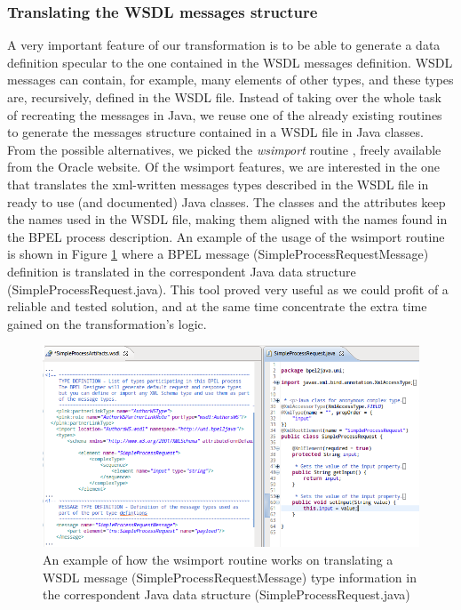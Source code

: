 \subsubsection{Translating the WSDL messages structure}
\label{sec:WSDLMEssagesStructure}
A very important feature of our transformation is to be able to generate a data definition specular to the one contained in the WSDL messages definition. WSDL messages can contain, for example, many elements of other types, and these types are, recursively, defined in the WSDL file. 
Instead of taking over the whole task of recreating the messages in Java, we reuse one of the already existing routines to generate the messages structure contained in a WSDL file in Java classes. From the possible alternatives, we picked the \textit{wsimport} routine \cite{wsimport}, freely available from the Oracle website. Of the wsimport features, we are interested in the one that translates the xml-written messages types described in the WSDL file in ready to use (and documented) Java classes. The classes and the attributes keep the names used in the WSDL file, making them aligned with the names found in the BPEL process description. 
An example of the usage of the wsimport routine is shown in Figure \ref{fig:wsimport} where a BPEL message (SimpleProcessRequestMessage) definition is translated in the correspondent Java data structure (SimpleProcessRequest.java).
This tool proved very useful as we could profit of a reliable and tested solution, and at the same time concentrate the extra time gained on the transformation's logic. 

\begin{figure}
  \begin{center}
    \includegraphics[scale=0.57]{pictures/wsImport.png}
    \caption{An example of how the wsimport routine works on translating a WSDL message (SimpleProcessRequestMessage) type information in the correspondent Java data structure (SimpleProcessRequest.java)}
    \label{fig:wsimport}
  \end{center}
\end{figure} 

